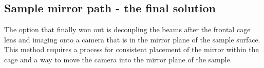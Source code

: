 \documentclass[twoside,openright,listof=numbered]{scrreprt}
\begin{document}
\subsection{Sample mirror path - the final solution}\label{SampleMirrorCamera}
The option that finally won out is decoupling the beams after the frontal cage lens and imaging onto a camera that is in the mirror plane of the sample surface. This method requires a process for consistent placement of the mirror within the cage and a way to move the camera into the mirror plane of the sample.\\
\end{document}
